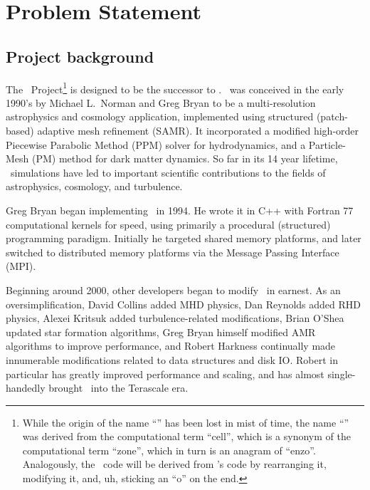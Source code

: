 \documentclass[11pt]{article}
\begin{document}

\section{Problem Statement}

\subsection{Project background}


    The \cello\ Project\footnote{While the origin of the name
    ``\enzo'' has been lost in mist of time, the name ``\cello'' was
    derived from the computational term ``cell'', which is a synonym
    of the computational term ``zone'', which in turn is an anagram of
    ``enzo''.  Analogously, the \cello\ code will be derived from
    \enzo's code by rearranging it, modifying it, and, uh, sticking an
    ``o'' on the end.}  is designed to be the successor to
    \enzo.  \enzo\ was conceived in the early 1990's by
    Michael L.~Norman and Greg Bryan to be a multi-resolution
    astrophysics and cosmology application, implemented using
    structured (patch-based) adaptive mesh refinement (SAMR).  It
    incorporated a modified high-order Piecewise Parabolic Method
    (PPM) solver for hydrodynamics, and a Particle-Mesh (PM) method
    for dark matter dynamics.  So far in its 14 year lifetime, \enzo\
    simulations have led to important scientific contributions to the
    fields of astrophysics, cosmology, and turbulence.

    Greg Bryan began implementing \enzo\ in 1994.  He wrote it in C++
    with Fortran 77 computational kernels for speed, using primarily a
    procedural (structured) programming paradigm.  Initially he
    targeted shared memory platforms, and later switched to
    distributed memory platforms via the Message Passing Interface
    (MPI).

    Beginning around 2000, other developers began to modify \enzo\ in
    earnest. As an oversimplification, David Collins added MHD
    physics, Dan Reynolds added RHD physics, Alexei Kritsuk added
    turbulence-related modifications, Brian O'Shea updated star
    formation algorithms, Greg Bryan himself modified AMR algorithms
    to improve performance, and Robert Harkness continually made
    innumerable modifications related to data structures and disk IO.
    Robert in particular has greatly improved performance and scaling,
    and has almost single-handedly brought \enzo\ into the Terascale
    era.
\end{document}
